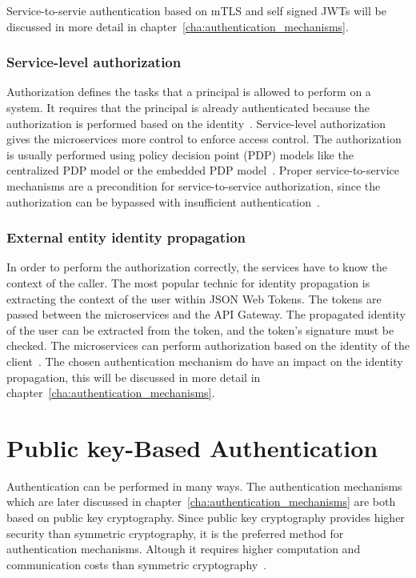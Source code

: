 Service-to-servie authentication based on mTLS and self signed JWTs will be discussed in more detail in chapter~\ref{cha:authentication_mechanisms}.

\subsubsection{Service-level authorization} 
\label{sec:service-level-authorization}
Authorization defines the tasks that a principal is allowed to perform on a system.
It requires that the principal is already authenticated because the authorization is performed based on the identity~\cite{siriwardena2014advanced}. 
Service-level authorization gives the microservices more control to enforce access control.
The authorization is usually performed using policy decision point (PDP) models like the centralized PDP model or the embedded PDP model~\cite{dias2020microservices, barabanov2020authentication}.
Proper service-to-service mechanisms are a precondition for service-to-service authorization, since the authorization can be bypassed with insufficient authentication~\cite{siriwardena2014advanced}.

\subsubsection{External entity identity propagation} 
\label{sec:external-entity-identity-propagation}
In order to perform the authorization correctly, the services have to know the context of the caller.
The most popular technic for identity propagation is extracting the context of the user within JSON Web Tokens.
The tokens are passed between the microservices and the API Gateway.
The propagated identity of the user can be extracted from the token, and the token's signature must be checked.
The microservices can perform authorization based on the identity of the client~\cite{barabanov2020authentication, dias2020microservices}.
The chosen authentication mechanism do have an impact on the identity propagation, this will be discussed in more detail in chapter~\ref{cha:authentication_mechanisms}.

\section{Public key-Based Authentication}
Authentication can be performed in many ways.
The authentication mechanisms which are later discussed in chapter~\ref{cha:authentication_mechanisms} are both based on public key cryptography.
Since public key cryptography provides higher security than symmetric cryptography, it is the preferred method for authentication mechanisms. 
Altough it requires higher computation and communication costs than symmetric cryptography~\cite{pubkeycrypto}.

